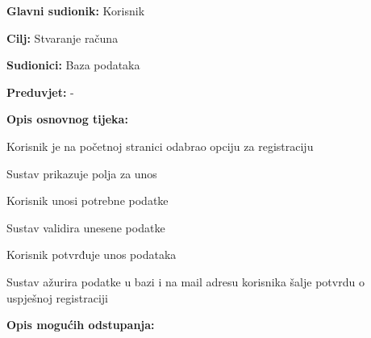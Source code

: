 					\noindent {}
					\begin{packed_item}
	
						\item \textbf{Glavni sudionik: }Korisnik
						\item  \textbf{Cilj:} Stvaranje računa
						\item  \textbf{Sudionici:} Baza podataka
						\item  \textbf{Preduvjet:} -
						\item  \textbf{Opis osnovnog tijeka:}
						
						\item[] \begin{packed_enum}
							\item Korisnik je na početnoj stranici odabrao opciju za registraciju
							\item Sustav prikazuje polja za unos
							\item Korisnik unosi potrebne podatke
							\item Sustav validira unesene podatke
							\item Korisnik potvrđuje unos podataka
							\item Sustav ažurira podatke u bazi i na mail adresu korisnika šalje potvrdu o uspješnoj registraciji
						\end{packed_enum}
						
						\item  \textbf{Opis mogućih odstupanja:}


\end{packed_item}
